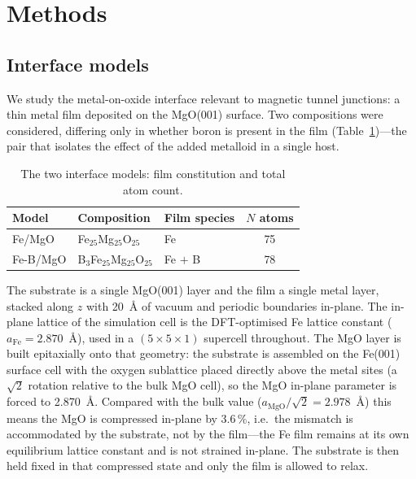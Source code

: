 \section{Methods}
\label{sec:methods}

\subsection{Interface models}
\label{sec:models}

We study the metal-on-oxide interface relevant to magnetic tunnel junctions: a thin metal film
deposited on the MgO(001) surface. Two compositions were considered, differing only in whether boron
is present in the film (Table~\ref{tab:models})---the pair that isolates the effect of the added
metalloid in a single host.

\begin{table}[t]
\small
\caption{\label{tab:models}The two interface models: film constitution and total atom count.}
\begin{tabular*}{\textwidth}{@{\extracolsep{\fill}}lllc}
\toprule
Model & Composition & Film species & $N$ atoms \\
\midrule
Fe/MgO & Fe$_{25}$Mg$_{25}$O$_{25}$ & Fe & 75 \\
Fe-B/MgO & B$_3$Fe$_{25}$Mg$_{25}$O$_{25}$ & Fe $+$ B & 78 \\
\bottomrule
\end{tabular*}
\end{table}

The substrate is a single MgO(001) layer and the film a single metal layer, stacked along $z$ with
20~\AA{} of vacuum and periodic boundaries in-plane. The in-plane lattice of the simulation
cell is the DFT-optimised Fe lattice constant ($a_\mathrm{Fe} = 2.870$~\AA), used in a $(5\times5\times1)$
supercell throughout. The MgO layer is built epitaxially onto that geometry: the substrate is
assembled on the Fe(001) surface cell with the oxygen sublattice placed directly above the metal
sites (a $\sqrt{2}$ rotation relative to the bulk MgO cell), so the MgO in-plane parameter is forced
to 2.870~\AA. Compared with the bulk value ($a_\mathrm{MgO}/\sqrt{2} = 2.978$~\AA) this means the
MgO is compressed in-plane by 3.6\,\%, i.e.\ the mismatch is accommodated by the substrate,
not by the film---the Fe film remains at its own equilibrium lattice constant and is not strained
in-plane. The substrate is then held fixed in that compressed state and only the film is
allowed to relax.

